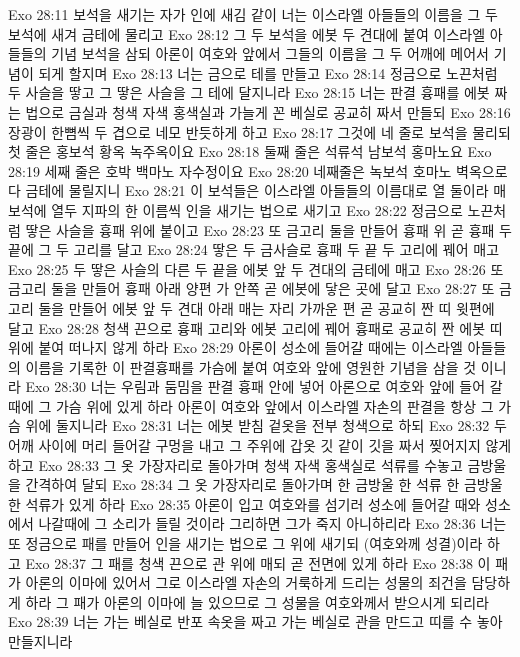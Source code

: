 Exo 28:11  보석을 새기는 자가 인에 새김 같이 너는 이스라엘 아들들의 이름을 그 두 보석에 새겨 금테에 물리고
Exo 28:12  그 두 보석을 에봇 두 견대에 붙여 이스라엘 아들들의 기념 보석을 삼되 아론이 여호와 앞에서 그들의 이름을 그 두 어깨에 메어서 기념이 되게 할지며
Exo 28:13  너는 금으로 테를 만들고
Exo 28:14  정금으로 노끈처럼 두 사슬을 땋고 그 땋은 사슬을 그 테에 달지니라
Exo 28:15  너는 판결 흉패를 에봇 짜는 법으로 금실과 청색 자색 홍색실과 가늘게 꼰 베실로 공교히 짜서 만들되
Exo 28:16  장광이 한뼘씩 두 겹으로 네모 반듯하게 하고
Exo 28:17  그것에 네 줄로 보석을 물리되 첫 줄은 홍보석 황옥 녹주옥이요
Exo 28:18  둘째 줄은 석류석 남보석 홍마노요
Exo 28:19  세째 줄은 호박 백마노 자수정이요
Exo 28:20  네째줄은 녹보석 호마노 벽옥으로 다 금테에 물릴지니
Exo 28:21  이 보석들은 이스라엘 아들들의 이름대로 열 둘이라 매 보석에 열두 지파의 한 이름씩 인을 새기는 법으로 새기고
Exo 28:22  정금으로 노끈처럼 땋은 사슬을 흉패 위에 붙이고
Exo 28:23  또 금고리 둘을 만들어 흉패 위 곧 흉패 두 끝에 그 두 고리를 달고
Exo 28:24  땋은 두 금사슬로 흉패 두 끝 두 고리에 꿰어 매고
Exo 28:25  두 땋은 사슬의 다른 두 끝을 에봇 앞 두 견대의 금테에 매고
Exo 28:26  또 금고리 둘을 만들어 흉패 아래 양편 가 안쪽 곧 에봇에 닿은 곳에 달고
Exo 28:27  또 금고리 둘을 만들어 에봇 앞 두 견대 아래 매는 자리 가까운 편 곧 공교히 짠 띠 윗편에 달고
Exo 28:28  청색 끈으로 흉패 고리와 에봇 고리에 꿰어 흉패로 공교히 짠 에봇 띠 위에 붙여 떠나지 않게 하라
Exo 28:29  아론이 성소에 들어갈 때에는 이스라엘 아들들의 이름을 기록한 이 판결흉패를 가슴에 붙여 여호와 앞에 영원한 기념을 삼을 것 이니라
Exo 28:30  너는 우림과 둠밈을 판결 흉패 안에 넣어 아론으로 여호와 앞에 들어 갈 때에 그 가슴 위에 있게 하라 아론이 여호와 앞에서 이스라엘 자손의 판결을 항상 그 가슴 위에 둘지니라
Exo 28:31  너는 에봇 받침 겉옷을 전부 청색으로 하되
Exo 28:32  두 어깨 사이에 머리 들어갈 구멍을 내고 그 주위에 갑옷 깃 같이 깃을 짜서 찢어지지 않게하고
Exo 28:33  그 옷 가장자리로 돌아가며 청색 자색 홍색실로 석류를 수놓고 금방울을 간격하여 달되
Exo 28:34  그 옷 가장자리로 돌아가며 한 금방울 한 석류 한 금방울 한 석류가 있게 하라
Exo 28:35  아론이 입고 여호와를 섬기러 성소에 들어갈 때와 성소에서 나갈때에 그 소리가 들릴 것이라 그리하면 그가 죽지 아니하리라
Exo 28:36  너는 또 정금으로 패를 만들어 인을 새기는 법으로 그 위에 새기되 (여호와께 성결)이라 하고
Exo 28:37  그 패를 청색 끈으로 관 위에 매되 곧 전면에 있게 하라
Exo 28:38  이 패가 아론의 이마에 있어서 그로 이스라엘 자손의 거룩하게 드리는 성물의 죄건을 담당하게 하라 그 패가 아론의 이마에 늘 있으므로 그 성물을 여호와께서 받으시게 되리라
Exo 28:39  너는 가는 베실로 반포 속옷을 짜고 가는 베실로 관을 만드고 띠를 수 놓아 만들지니라
